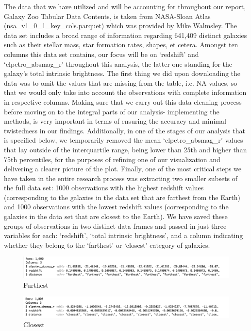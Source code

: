 \documentclass[12pt]{article}
\begin{document}
The data that we have utilized and will be accounting for throughout our report, Galaxy Zoo Tabular Data Contents, is taken from NASA-Sloan Atlas (nsa\_v1\_0\_1\_key\_cols.parquet) which was provided by Mike Walmsley. The data set includes a broad range of information regarding 641,409 distinct galaxies such as their stellar mass, star formation rates, shapes, et cetera. Amongst ten columns this data set contains, our focus will be on `redshift' and `elpetro\_absmag\_r' throughout this analysis, the latter one standing for the galaxy's total intrinsic brightness. The first thing we did upon downloading the data was to omit the values that are missing from the table, i.e. NA values, so that we would only take into account the observations with complete information in respective columns. Making sure that we carry out this data cleaning process before moving on to the integral parts of our analysis- implementing the methods, is very important in terms of ensuring the accuracy and minimal twistedness in our findings. Additionally, in one of the stages of our analysis that is specified below, we temporarily removed the mean `elpetro\_absmag\_r' values that lay outside of the interquartile range, being lower than 25th and higher than 75th percentiles, for the purposes of refining one of our visualization and delivering a clearer picture of the plot. Finally, one of the most critical steps we have taken in the entire research process was extracting two smaller subsets of the full data set: 1000 observations with the highest redshift values (corresponding to the galaxies in the data set that are farthest from the Earth) and 1000 observations with the lowest redshift values (corresponding to the galaxies in the data set that are closest to the Earth). We have saved these groups of observations in two distinct data frames and passed in just three variables for each: `redshift', `total intrinsic brightness', and a column indicating whether they belong to the `farthest' or `closest' category of galaxies.

\newpage
\begin{figure}[h]
	\centering
	\includegraphics[width=1.0\textwidth]{pic/r2t0.png}
	\caption{Furthest}
\end{figure}

\begin{figure}[h]
	\centering
	\includegraphics[width=1.0\textwidth]{pic/r2t1.png}
	\caption{Closest}
\end{figure}
\end{document}

